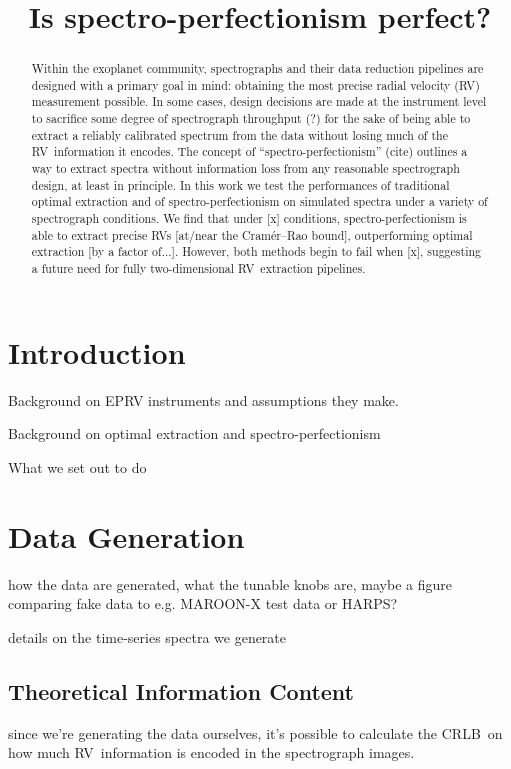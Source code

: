 \documentclass[modern]{aastex61}
\newcommand{\acronym}[1]{{\small{#1}}}
\newcommand{\RV}{\acronym{RV}}
\newcommand{\CRLB}{\acronym{CRLB}}
\begin{document}
\sloppy\sloppypar\raggedbottom\frenchspacing %
\graphicspath{ {figures/} }

\title{Is spectro-perfectionism perfect?}

\begin{abstract}\noindent
Within the exoplanet community, spectrographs and their data reduction pipelines are designed with a primary goal in mind: obtaining the most precise radial velocity (\RV) measurement possible. 
In some cases, design decisions are made at the instrument level to sacrifice some degree of spectrograph throughput (?) for the sake of being able to extract a reliably calibrated spectrum from the data without losing much of the \RV\ information it encodes. 
The concept of ``spectro-perfectionism'' (cite) outlines a way to extract spectra without information loss from any reasonable spectrograph design, at least in principle. 
In this work we test the performances of traditional optimal extraction and of spectro-perfectionism on simulated spectra under a variety of spectrograph conditions. 
We find that under [x] conditions, spectro-perfectionism is able to extract precise \RV s [at/near the Cram\'er--Rao bound], outperforming optimal extraction [by a factor of...]. 
However, both methods begin to fail when [x], suggesting a future need for fully two-dimensional \RV\ extraction pipelines.
\end{abstract}

\section{Introduction}

Background on EPRV instruments and assumptions they make.

Background on optimal extraction and spectro-perfectionism

What we set out to do

\section{Data Generation}
how the data are generated, what the tunable knobs are, maybe a figure comparing fake data to e.g. MAROON-X test data or HARPS?

details on the time-series spectra we generate

\subsection{Theoretical Information Content}
since we're generating the data ourselves, it's possible to calculate the \CRLB\ on how much \RV\ information is encoded in the spectrograph images.
\end{document}
